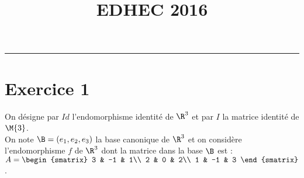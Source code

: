 \documentclass[11pt]{article}%
\title{\bf \vspace{-2cm} EDHEC 2016} %
\author{} %
\date{} %
\begin{document}
\maketitle %
\vspace{-1.4cm}\hrule %
\thispagestyle{fancy}



\section*{Exercice 1}
\noindent
On désigne par $Id$ l'endomorphisme identité de $\R^3$ et par $I$ la
matrice identité de $\M{3}$. \\
On note $\B = (e_{1},e_{2},e_{3})$ la base canonique de $\R^3$ et on
considère l'endomorphisme $f$ de $\R^3$ dont la matrice dans la base
$\B$ est : $A =
\begin{smatrix}
  3 & -1 & 1\\
  2 & 0 & 2\\
  1 & -1 & 3
\end{smatrix}
$. 
\end{document}
